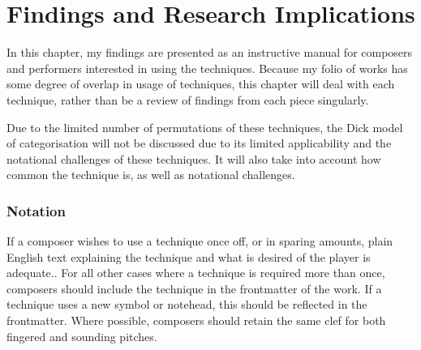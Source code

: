 
\chapter{Findings and Research Implications}\label{ch:chapter4}
In this chapter, my findings are presented as an instructive manual for composers and performers interested in using the techniques.
Because my folio of works has some degree of overlap in usage of techniques, this chapter will deal with each technique, rather than be a review of findings from each piece singularly.


Due to the limited number of permutations of these techniques, the Dick model of categorisation will not be discussed due to its limited applicability and the notational challenges of these techniques.\autocite{dickOtherFlute1989} 
It will also take into account how common the technique is, as well as notational challenges.

\subsection{Notation}
If a composer wishes to use a technique once off, or in sparing amounts, plain English text explaining the technique and what is desired of the player is adequate..\autocite[494]{gouldBars2011}
For all other cases where a technique is required more than once, composers should include the technique in the frontmatter of the work.\autocite[494]{gouldBars2011}
If a technique uses a new symbol or notehead, this should be reflected in the frontmatter.
Where possible, composers should retain the same clef for both fingered and sounding pitches.\autocite[422]{gouldBars2011}

